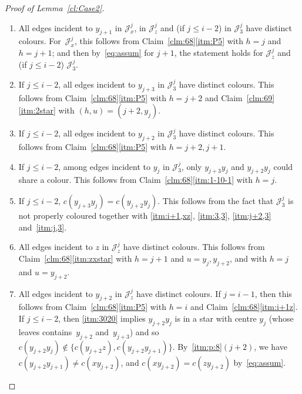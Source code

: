 \documentclass[a4paper, 12pt]{article}
\numberwithin{equation}{section}
\newcommand{\ms}[1]{\mathscr{#1}}
\begin{document}
\begin{proof}[Proof of Lemma~\ref{cl:Case2}]
\begin{enumerate}[label = {\rm(f$_{\arabic*}$)}]


\item\label{itm:i+1,xz} 
All edges incident to $y_{j+1}$ in $\ms{J}_x^j$, in $\ms{J}_z^j$ and (if $j \leq i-2$) in $\ms{J}_3^j$ have distinct colours.
For~$\ms{J}^j_x$, this follows from Claim~\ref{clm:68}\ref{itm:P5} with $h = j$ and $h = j+1$; and then by~\eqref{eq:assum} for $j+1$, the statement holds for $\ms{J}^j_z$ and (if $j \leq i-2$) $\ms{J}_3^j$.

\item\label{itm:3,3} %
If $j \leq i-2$, 
all edges incident to $y_{j+3}$ in $\ms{J}_3^j$ have distinct colours.
This follows from Claim~\ref{clm:68}\ref{itm:P5} with $h = j+2$ and Claim~\ref{clm:69}\ref{itm:2star} with $(h,u)=(j+2,y_{j})$.


\item\label{itm:j+2,3} %
If $j \leq i-2$,
all edges incident to $y_{j+2}$ in $\ms{J}_3^j$ have distinct colours.
This follows from Claim~\ref{clm:68}\ref{itm:P5} with $h=j+2,j+1$.


\item\label{itm:j,3} %
If $j \leq i-2$,
among edges incident to $y_j$ in $\ms{J}_3^j$, only $y_{j+3}y_j$ and $y_{j+2}y_j$ could share a colour.
This follows from Claim~\ref{clm:68}\ref{itm:1-10-1} with $h=j$.


\item\label{itm:3020} %
If $j \leq i-2$,
$c(y_{j+3}y_j) = c(y_{j+2}y_j)$.
This follows from the fact that $\ms{J}^j_3$ is not properly coloured together with
\ref{itm:i+1,xz}, 
\ref{itm:3,3}, \ref{itm:j+2,3} and~\ref{itm:j,3}.




\item\label{itm:z,z} 
All edges incident to $z$ in $\ms{J}_z^j$ have distinct colours.
This follows from Claim~\ref{clm:68}\ref{itm:zxstar} with $h=j+1$ and $u=y_j, y_{j+2}$,
and with $h=j$ and $u=y_{j+2}$.




\item\label{itm:z,j+2} %
All edges incident to $y_{j+2}$ in $\ms{J}^j_z$ have distinct colours.
If $j = i-1$, then this follows from Claim~\ref{clm:68}\ref{itm:P5} with $h=i$ and Claim~\ref{clm:68}\ref{itm:i+1z}.
If $j \le i-2$, then \ref{itm:3020} implies $y_{j+2}y_j$ is in a star with centre $y_j$ (whose leaves contains~$y_{j+2}$ and~$y_{j+3}$)
 and so $c(y_{j+2}y_j) \notin \{ c(y_{j+2}z), c(y_{j+2}y_{j+1})\}$.
By~\ref{itm:p:8}$(j+2)$, we have $c(y_{j+2}y_{j+1}) \neq c(xy_{j+2})$,
and $c(xy_{j+2})=c(zy_{j+2})$ by~\eqref{eq:assum}.



\end{enumerate}
\end{proof}
\end{document}
